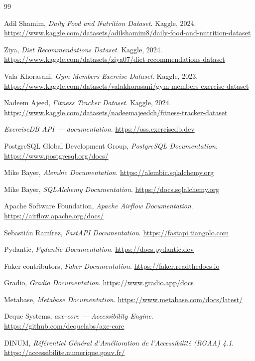 \documentclass{article}
\begin{document}
\begin{thebibliography}{99}

 Adil Shamim, \emph{Daily Food and Nutrition Dataset}. Kaggle, 2024. \url{https://www.kaggle.com/datasets/adilshamim8/daily-food-and-nutrition-dataset}

 Ziya, \emph{Diet Recommendations Dataset}. Kaggle, 2024. \url{https://www.kaggle.com/datasets/ziya07/diet-recommendations-dataset}

 Vala Khorasani, \emph{Gym Members Exercise Dataset}. Kaggle, 2023. \url{https://www.kaggle.com/datasets/valakhorasani/gym-members-exercise-dataset}

 Nadeem Ajeed, \emph{Fitness Tracker Dataset}. Kaggle, 2024. \url{https://www.kaggle.com/datasets/nadeemajeedch/fitness-tracker-dataset}

 \emph{ExerciseDB API — documentation}. \url{https://oss.exercisedb.dev}

 PostgreSQL Global Development Group, \emph{PostgreSQL Documentation}. \url{https://www.postgresql.org/docs/}

 Mike Bayer, \emph{Alembic Documentation}. \url{https://alembic.sqlalchemy.org}

 Mike Bayer, \emph{SQLAlchemy Documentation}. \url{https://docs.sqlalchemy.org}

 Apache Software Foundation, \emph{Apache Airflow Documentation}. \url{https://airflow.apache.org/docs/}

 Sebastián Ramírez, \emph{FastAPI Documentation}. \url{https://fastapi.tiangolo.com}

 Pydantic, \emph{Pydantic Documentation}. \url{https://docs.pydantic.dev}

 Faker contributors, \emph{Faker Documentation}. \url{https://faker.readthedocs.io}

 Gradio, \emph{Gradio Documentation}. \url{https://www.gradio.app/docs}

 Metabase, \emph{Metabase Documentation}. \url{https://www.metabase.com/docs/latest/}

 Deque Systems, \emph{axe-core — Accessibility Engine}. \url{https://github.com/dequelabs/axe-core}

 DINUM, \emph{Référentiel Général d'Amélioration de l'Accessibilité (RGAA) 4.1}. \url{https://accessibilite.numerique.gouv.fr/}

\end{thebibliography}
\end{document}
